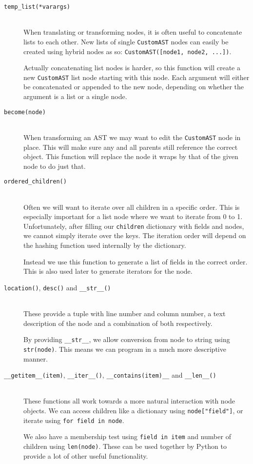 \documentclass[twoside,a4paper]{report}
\begin{document}
\begin{description}
\item[\texttt{temp\_list(*varargs)}] \hfill \\
When translating or transforming nodes, it is often useful to concatenate lists to each other. New lists of single \texttt{CustomAST} nodes can easily be
created using hybrid nodes as so: \texttt{CustomAST([node1, node2, ...])}.

Actually concatenating list nodes is harder, so this function will create a new \texttt{CustomAST} list node starting with this node. Each argument will either be
concatenated or appended to the new node, depending on whether the argument is a list or a single node.

\item[\texttt{become(node)}] \hfill \\
When transforming an AST we may want to edit the \texttt{CustomAST} node in place. This will make sure any and all parents still reference the correct
object. This function will replace the node it wraps by that of the given node to do just that.

\item[\texttt{ordered\_children()}] \hfill \\
Often we will want to iterate over all children in a specific order. This is especially important for a list node where we want to iterate from 0 to 1.
Unfortunately, after filling our \texttt{children} dictionary with fields and nodes, we cannot simply iterate over the keys. The iteration order will
depend on the hashing function used internally by the dictionary.

Instead we use this function to generate a list of fields in the correct order. This is also used later to generate iterators for the node.

\item[\texttt{location()}, \texttt{desc()} and \texttt{\_\_str\_\_()}] \hfill \\
These provide a tuple with line number and column number, a text description of the node and a combination of both respectively.

By providing \texttt{\_\_str\_\_}, we allow conversion from node to string using \texttt{str(node)}. This means we can program in a much more
descriptive manner.

\item[\texttt{\_\_getitem\_\_(item)}, \texttt{\_\_iter\_\_()}, \texttt{\_\_contains(item)\_\_} and \texttt{\_\_len\_\_()}] \hfill \\
These functions all work towards a more natural interaction with node objects. We can access children like a dictionary using \texttt{node["field"]}, or
iterate using \texttt{for field in node}.

We also have a membership test using \texttt{field in item} and number of children using \texttt{len(node)}. These can be used together by Python to provide
a lot of other useful functionality.

\end{description}
\end{document}
